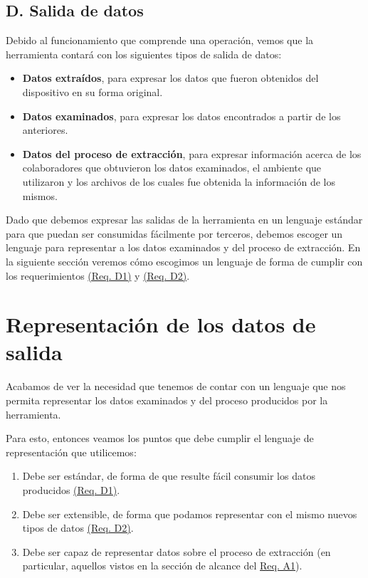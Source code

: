\subsection*{D. Salida de datos}
Debido al funcionamiento que comprende una operación, vemos que la herramienta contará con los siguientes tipos de salida de datos:

\begin{itemize}
\item \textbf{Datos extraídos}, para expresar los datos que fueron obtenidos del dispositivo en su forma original.
\item \textbf{Datos examinados}, para expresar los datos encontrados a partir de los anteriores.
\item \textbf{Datos del proceso de extracción}, para expresar información acerca de los colaboradores que obtuvieron los datos examinados, el ambiente que utilizaron y los archivos de los cuales fue obtenida la información de los mismos.
\end{itemize}

Dado que debemos expresar las salidas de la herramienta en un lenguaje estándar para que puedan ser consumidas fácilmente por terceros, debemos escoger un lenguaje para representar a los datos examinados y del proceso de extracción. En la siguiente sección veremos cómo escogimos un lenguaje de forma de cumplir con los requerimientos \hyperref[reqD1]{(Req. D1)} y \hyperref[reqD2]{(Req. D2)}.

\section{Representación de los datos de salida}
Acabamos de ver la necesidad que tenemos de contar con un lenguaje que nos permita representar los datos examinados y del proceso producidos por la herramienta.

Para esto, entonces veamos los puntos que debe cumplir el lenguaje de representación que utilicemos:

\begin{enumerate}
\item Debe ser estándar, de forma de que resulte fácil consumir los datos producidos \hyperref[reqD1]{(Req. D1)}.
\item Debe ser extensible, de forma que podamos representar con el mismo nuevos tipos de datos \hyperref[reqD2]{(Req. D2)}.
\item Debe ser capaz de representar datos sobre el proceso de extracción (en particular, aquellos vistos en la sección de alcance del \hyperref[reqA1]{Req. A1}).
\end{enumerate}

